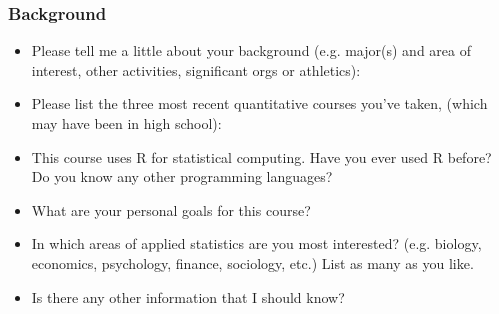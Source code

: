 \documentclass[10pt]{article}
\begin{document}
\subsubsection*{Background}
\begin{itemize}
  \itemsep0.9in
	\item Please tell me a little about your background (e.g. major(s) and area of interest, other activities, significant orgs or athletics):
	\item Please list the three most recent quantitative courses you've taken, (which may have been in high school):
	\item This course uses R for statistical computing. Have you ever used R before? Do you know any other programming languages?
	\item What are your personal goals for this course?
	\item In which areas of applied statistics are you most interested? (e.g. biology, economics, psychology, finance, sociology, etc.) List as many as you like. 
	\vspace{0.7in}
  \vspace{-0.7in}
	\item Is there any other information that I should know?
\end{itemize}
\end{document}
